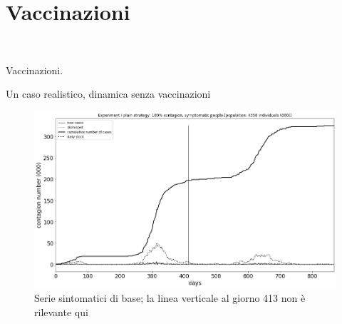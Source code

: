 \documentclass[]{beamer}
\begin{document}
\section{Vaccinazioni}


\begin{frame}{~}

\Huge Vaccinazioni.

\end{frame}

\begin{frame}{Un caso realistico, dinamica senza vaccinazioni}


\begin{figure}[H]
\center
\includegraphics[scale=0.16]{Experiment_I_base_symptomatic_series.png}

\caption{Serie sintomatici di base; la linea verticale al giorno 413 non \`{e} rilevante qui}
\label{Experiment_I_plainSymptomaticSeries}
\end{figure}


\end{frame}
\end{document}
